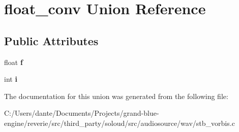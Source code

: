 \hypertarget{unionfloat__conv}{}\section{float\+\_\+conv Union Reference}
\label{unionfloat__conv}
\subsection*{Public Attributes}
\begin{DoxyCompactItemize}
\item 
\mbox{\label{unionfloat__conv_a500605cabc18ae27268bcd0af4276c16}} 
float {\bfseries f}
\item 
\mbox{\label{unionfloat__conv_a9e1033bdaee2009f7d6ba9f529da0f8b}} 
int {\bfseries i}
\end{DoxyCompactItemize}


The documentation for this union was generated from the following file\+:\begin{DoxyCompactItemize}
\item 
C\+:/\+Users/dante/\+Documents/\+Projects/grand-\/blue-\/engine/reverie/src/third\+\_\+party/soloud/src/audiosource/wav/stb\+\_\+vorbis.\+c\end{DoxyCompactItemize}
